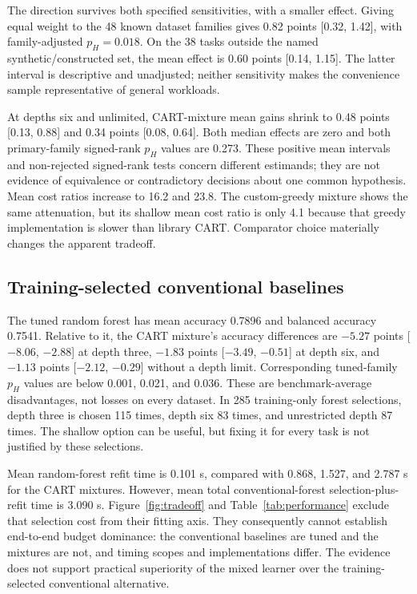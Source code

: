 The direction survives both specified sensitivities, with a smaller effect. Giving equal weight to the 48 known dataset families gives 0.82 points [0.32, 1.42], with family-adjusted $p_H=0.018$. On the 38 tasks outside the named synthetic/constructed set, the mean effect is 0.60 points [0.14, 1.15]. The latter interval is descriptive and unadjusted; neither sensitivity makes the convenience sample representative of general workloads.

At depths six and unlimited, CART-mixture mean gains shrink to 0.48 points [0.13, 0.88] and 0.34 points [0.08, 0.64]. Both median effects are zero and both primary-family signed-rank $p_H$ values are 0.273. These positive mean intervals and non-rejected signed-rank tests concern different estimands; they are not evidence of equivalence or contradictory decisions about one common hypothesis. Mean cost ratios increase to 16.2 and 23.8. The custom-greedy mixture shows the same attenuation, but its shallow mean cost ratio is only 4.1 because that greedy implementation is slower than library CART. Comparator choice materially changes the apparent tradeoff.

\subsection{Training-selected conventional baselines}
The tuned random forest has mean accuracy 0.7896 and balanced accuracy 0.7541. Relative to it, the CART mixture's accuracy differences are $-5.27$ points [$-8.06$, $-2.88$] at depth three, $-1.83$ points [$-3.49$, $-0.51$] at depth six, and $-1.13$ points [$-2.12$, $-0.29$] without a depth limit. Corresponding tuned-family $p_H$ values are below 0.001, 0.021, and 0.036. These are benchmark-average disadvantages, not losses on every dataset. In 285 training-only forest selections, depth three is chosen 115 times, depth six 83 times, and unrestricted depth 87 times. The shallow option can be useful, but fixing it for every task is not justified by these selections.

Mean random-forest refit time is 0.101 s, compared with 0.868, 1.527, and 2.787 s for the CART mixtures. However, mean total conventional-forest selection-plus-refit time is 3.090 s. Figure~\ref{fig:tradeoff} and Table~\ref{tab:performance} exclude that selection cost from their fitting axis. They consequently cannot establish end-to-end budget dominance: the conventional baselines are tuned and the mixtures are not, and timing scopes and implementations differ. The evidence does not support practical superiority of the mixed learner over the training-selected conventional alternative.
